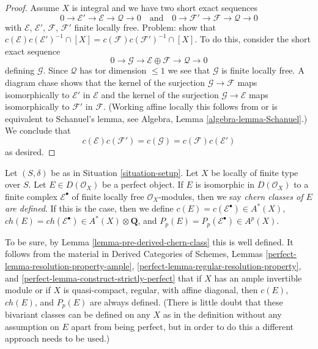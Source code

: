 \begin{proof}
\medskip\noindent
Assume $X$ is integral and we have two short exact sequences
$$
0 \to \mathcal{E}' \to \mathcal{E} \to \mathcal{Q} \to 0
\quad\text{and}\quad
0 \to \mathcal{F}' \to \mathcal{F} \to \mathcal{Q} \to 0
$$
with $\mathcal{E}$, $\mathcal{E}'$, $\mathcal{F}$, $\mathcal{F}'$
finite locally free. Problem: show that
$c(\mathcal{E})c(\mathcal{E}')^{-1} \cap [X] =
c(\mathcal{F})c(\mathcal{F}')^{-1} \cap [X]$.
To do this, consider the short exact sequence
$$
0 \to \mathcal{G} \to \mathcal{E} \oplus \mathcal{F} \to \mathcal{Q} \to 0
$$
defining $\mathcal{G}$. Since $\mathcal{Q}$ has tor dimension $\leq 1$
we see that $\mathcal{G}$ is finite locally free. A diagram chase
shows that the kernel of the surjection $\mathcal{G} \to \mathcal{F}$
maps isomorphically to $\mathcal{E}'$ in $\mathcal{E}$ and
the kernel of the surjection $\mathcal{G} \to \mathcal{E}$ maps
isomorphically to $\mathcal{F}'$ in $\mathcal{F}$. (Working affine
locally this follows from or is equivalent to Schanuel's lemma, see
Algebra, Lemma \ref{algebra-lemma-Schanuel}.)
We conclude that
$$
c(\mathcal{E})c(\mathcal{F}') = c(\mathcal{G}) =
c(\mathcal{F})c(\mathcal{E}')
$$
as desired.
\end{proof}

\begin{definition}
\label{definition-defined-on-perfect}
Let $(S, \delta)$ be as in Situation \ref{situation-setup}.
Let $X$ be locally of finite type over $S$. Let $E \in D(\mathcal{O}_X)$
be a perfect object. If $E$ is isomorphic in $D(\mathcal{O}_X)$
to a finite complex $\mathcal{E}^\bullet$ of finite locally free
$\mathcal{O}_X$-modules, then we say {\it chern classes of $E$ are defined}.
If this is the case, then we define $c(E) = c(\mathcal{E}^\bullet) \in A^*(X)$,
$ch(E) = ch(\mathcal{E}^\bullet) \in A^*(X) \otimes \mathbf{Q}$, and
$P_p(E) = P_p(\mathcal{E}^\bullet) \in A^p(X)$.
\end{definition}

\noindent
To be sure, by Lemma \ref{lemma-pre-derived-chern-class} this is well defined.
It follows from the material in Derived Categories of Schemes,
Lemmas \ref{perfect-lemma-resolution-property-ample},
\ref{perfect-lemma-regular-resolution-property}, and
\ref{perfect-lemma-construct-strictly-perfect}
that if $X$ has an ample invertible module or if
$X$ is quasi-compact, regular, with affine diagonal, then
$c(E)$, $ch(E)$, and $P_p(E)$ are always defined. (There is little doubt
that these bivariant classes can be defined on any $X$ as in the
definition without any assumption
on $E$ apart from being perfect, but in order to do this a different
approach needs to be used.)


